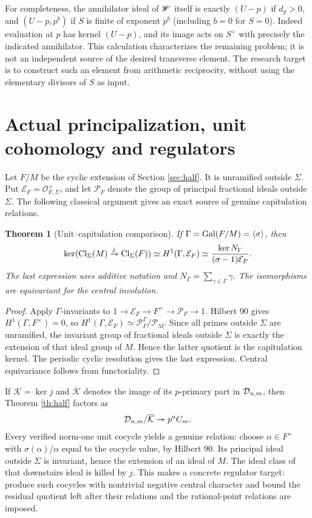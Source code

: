 \documentclass[11pt,a4paper]{article}
\newtheorem{theorem}{Theorem}[section]
\theoremstyle{definition}\newtheorem{definition}[theorem]{Definition}
\theoremstyle{remark}\newtheorem{remark}[theorem]{Remark}
\numberwithin{equation}{section}
\begin{document}
For completeness, the annihilator ideal of $\mathscr W$ itself is exactly $(U-p)$ if $d_p>0$, and $(U-p,p^b)$ if $S$ is finite of exponent $p^b$ (including $b=0$ for $S=0$). Indeed evaluation at $p$ has kernel $(U-p)$, and its image acts on $S^\vee$ with precisely the indicated annihilator. This calculation characterizes the remaining problem; it is not an independent source of the desired transverse element. The research target is to construct such an element from arithmetic reciprocity, without using the elementary divisors of $S$ as input.


\section{Actual principalization, unit cohomology and regulators}\label{sec:units}
Let $F/M$ be the cyclic extension of Section \ref{sec:half}. It is unramified outside $\Sigma$. Put $\mathcal E_F=\mathcal O_{F,\Sigma}^\times$, and let $\mathcal P_F$ denote the group of principal fractional ideals outside $\Sigma$. The following classical argument gives an exact source of genuine capitulation relations.
\begin{theorem}[Unit--capitulation comparison]\label{th:units}
If $\Gamma=\operatorname{Gal}(F/M)=\langle\sigma\rangle$, then
\begin{equation}\label{eq:units}
\ker(\operatorname{Cl}_\Sigma(M)\xrightarrow{j}\operatorname{Cl}_\Sigma(F))
\simeq H^1(\Gamma,\mathcal E_F)
\simeq \frac{\ker N_\Gamma}{(\sigma-1)\mathcal E_F}.
\end{equation}
The last expression uses additive notation and $N_\Gamma=\sum_{\gamma\in\Gamma}\gamma$. The isomorphisms are equivariant for the central involution.
\end{theorem}
\begin{proof}
Apply $\Gamma$-invariants to $1\to\mathcal E_F\to F^\times\to\mathcal P_F\to1$. Hilbert 90 gives $H^1(\Gamma,F^\times)=0$, so $H^1(\Gamma,\mathcal E_F)\simeq\mathcal P_F^\Gamma/\mathcal P_M$. Since all primes outside $\Sigma$ are unramified, the invariant group of fractional ideals outside $\Sigma$ is exactly the extension of that ideal group of $M$. Hence the latter quotient is the capitulation kernel. The periodic cyclic resolution gives the last expression. Central equivariance follows from functoriality.\end{proof}
If $\mathcal K=\ker j$ and $\overline{\mathcal K}$ denotes the image of its $p$-primary part in $\mathcal D_{n,m}$, then Theorem \ref{th:half} factors as
\[
\mathcal D_{n,m}/\overline{\mathcal K}\twoheadrightarrow p^aC_m.
\]
Every verified norm-one unit cocycle yields a genuine relation: choose $\alpha\in F^\times$ with $\sigma(\alpha)/\alpha$ equal to the cocycle value, by Hilbert 90. Its principal ideal outside $\Sigma$ is invariant, hence the extension of an ideal of $M$. The ideal class of that downstairs ideal is killed by $j$. This makes a concrete regulator target: produce such cocycles with nontrivial negative central character and bound the residual quotient left after their relations and the rational-point relations are imposed.
\end{document}
